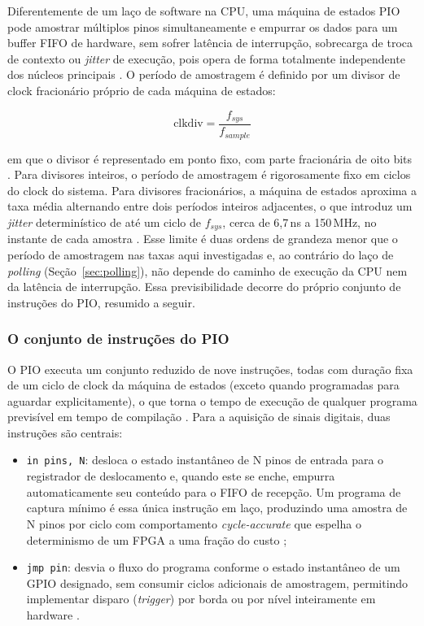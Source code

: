 Diferentemente de um laço de software na \ac{CPU}, uma máquina de estados
\ac{PIO} pode amostrar múltiplos pinos simultaneamente e empurrar os dados para
um buffer \ac{FIFO} de hardware, sem sofrer latência de interrupção, sobrecarga
de troca de contexto ou \emph{jitter} de execução, pois opera de forma
totalmente independente dos núcleos principais
\cite{rpi2024ds,weber2025,mehr2025}. O período de amostragem é definido por um
divisor de clock fracionário próprio de cada máquina de estados:

\begin{equation}\label{eq:clkdiv}
  \text{clkdiv} = \frac{f_{sys}}{f_{sample}}
\end{equation}

\noindent em que o divisor é representado em ponto fixo, com parte fracionária
de oito bits \cite{rpi2024ds}. Para divisores inteiros, o período de amostragem
é rigorosamente fixo em ciclos do clock do sistema. Para divisores
fracionários, a máquina de estados aproxima a taxa média alternando entre dois
períodos inteiros adjacentes, o que introduz um \emph{jitter} determinístico de
até um ciclo de $f_{sys}$, cerca de 6,7\,ns a 150\,MHz, no instante de
cada amostra \cite{rpi2024ds}. Esse limite é duas ordens de grandeza menor que
o período de amostragem nas taxas aqui investigadas e, ao contrário do laço de
\emph{polling} (Seção~\ref{sec:polling}), não depende do caminho de execução da
\ac{CPU} nem da latência de interrupção. Essa previsibilidade decorre do próprio
conjunto de instruções do \ac{PIO}, resumido a seguir.

\subsubsection{O conjunto de instruções do PIO}\label{sec:pio-isa}

O \ac{PIO} executa um conjunto reduzido de nove instruções, todas com duração
fixa de um ciclo de clock da máquina de estados (exceto quando programadas para
aguardar explicitamente), o que torna o tempo de execução de qualquer programa
previsível em tempo de compilação \cite{rpi2024ds}. Para a aquisição de sinais
digitais, duas instruções são centrais:

\begin{itemize}
  \item \texttt{in pins, N}: desloca o estado instantâneo de N pinos de
        entrada para o registrador de deslocamento e, quando este se enche, empurra
        automaticamente seu conteúdo para o \ac{FIFO} de recepção. Um programa de captura
        mínimo é essa única instrução em laço, produzindo uma amostra de N pinos por
        ciclo com comportamento \emph{cycle-accurate} que espelha o determinismo de
        um \ac{FPGA} a uma fração do custo \cite{rpi2024ds};
  \item \texttt{jmp pin}: desvia o fluxo do programa conforme o estado
        instantâneo de um \ac{GPIO} designado, sem consumir ciclos adicionais de
        amostragem, permitindo implementar disparo (\emph{trigger}) por borda ou por
        nível inteiramente em hardware \cite{rpi2024ds,starkey2024}.
\end{itemize}

